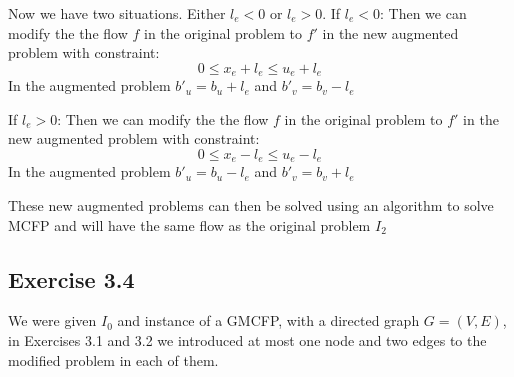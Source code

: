 Now we have two situations. Either \(l_e<0\) or \(l_e > 0\).\newline
If \(l_e<0\): Then we can modify the the flow \(f\) in the original problem to \(f'\) in the new augmented problem with constraint: \[ 0 \le x_e + l_e \le u_e + l_e\]
In the augmented problem \(b'_u = b_u + l_e\) and \(b'_v = b_v - l_e\)

If \(l_e>0\): Then we can modify the the flow \(f\) in the original problem to \(f'\) in the new augmented problem with constraint: \[ 0 \le x_e - l_e \le u_e - l_e\]
In the augmented problem \(b'_u = b_u - l_e\) and \(b'_v = b_v + l_e\)

These new augmented problems can then be solved using an algorithm to solve MCFP and will have the same flow as the original problem \(I_2\)


\subsection{Exercise 3.4}
We were given \(I_0\) and instance of a GMCFP, with a directed graph \(G =(V,E)\), in Exercises 3.1 and 3.2 we introduced at most one node and two edges to the modified problem in each of them.

